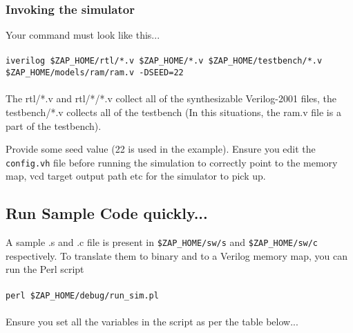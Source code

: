 \documentclass[11pt]{article}
\begin{document}

\subsubsection{Invoking the simulator}
Your command must look like this...\\\\
\texttt{iverilog \$ZAP\_HOME/rtl/*.v \$ZAP\_HOME/*.v \$ZAP\_HOME/testbench/*.v
\$ZAP\_HOME/models/ram/ram.v -DSEED=22}\\\\

The rtl/*.v and rtl/*/*.v collect all of the synthesizable Verilog-2001 files,
the testbench/*.v collects all of the testbench (In this situations, the ram.v
file is a part of the testbench).

Provide some seed value (22 is used in the example). Ensure you edit the 
\texttt{config.vh} file before running the simulation to correctly point to the
memory map, vcd target output path etc for the simulator to pick up.


\subsection{Run Sample Code quickly...}
A sample .s and .c file is present in \texttt{\$ZAP\_HOME/sw/s} and 
\texttt{\$ZAP\_HOME/sw/c} respectively. To translate them to binary and to a 
Verilog memory map, you can run the Perl script \\\\ 
\texttt{perl \$ZAP\_HOME/debug/run\_sim.pl} \\\\ Ensure you set all the variables
in the script as per the table below...\\\\
\end{document}

